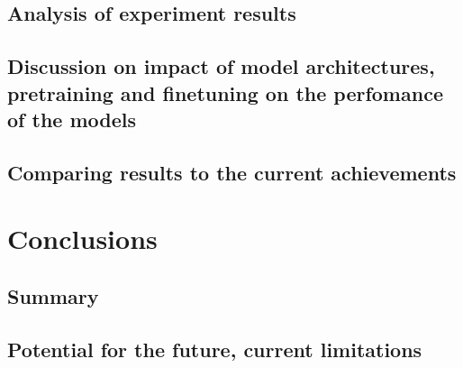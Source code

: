 \documentclass[a4paper,12pt]{report}
\begin{document}
\section{Analysis of experiment results}
\section{Discussion on impact of model architectures, pretraining and finetuning on the perfomance of the models}
\section{Comparing results to the current achievements}


\chapter{Conclusions}\label{cap:conclusions}
\section{Summary}
\section{Potential for the future, current limitations}



    
    
\end{document}
